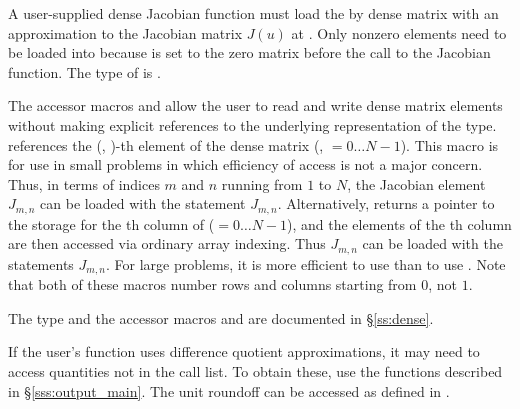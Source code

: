 {
  A user-supplied dense Jacobian function must load the  by 
  dense matrix  with an approximation to the Jacobian matrix $J(u)$ at .
  Only nonzero elements need to be loaded
  into  because  is set to the zero matrix before the call
  to the Jacobian function. The type of  is . 
  
  The accessor macros  and  allow the user to
  read and write dense matrix elements without making explicit
  references to the underlying representation of the 
  type.  references the (, )-th
  element of the dense matrix  (, $= 0\ldots N-1$). This macro
  is for use in small problems in which efficiency of access is not a major
  concern.  Thus, in terms of indices $m$ and $n$ running from $1$ to
  $N$, the Jacobian element $J_{m,n}$ can be loaded with the statement
   $J_{m,n}$.  Alternatively,
   returns a pointer to the storage for
  the th column of  ($= 0\ldots N-1$), and the 
  elements of the th column
  are then accessed via ordinary array indexing.  Thus $J_{m,n}$ can be 
  loaded with the statements 
   $J_{m,n}$.  For large problems, it is more 
  efficient to use  than to use . 
  Note that both of these macros number rows and columns
  starting from $0$, not $1$.  

  The  type and the accessor macros  and 
   are documented in \S\ref{ss:dense}.

  If the user's  function uses difference quotient
  approximations, it may need to access quantities not in the call
  list. To obtain these, use the  functions described in
  \S\ref{sss:output_main}. The unit roundoff can be accessed
  as  defined in .
}

